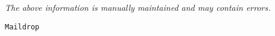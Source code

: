 \label{pkg:maildrop}

{\tiny \it The above information is manually maintained and may contain errors.}
\begin{verbatim}
Maildrop
\end{verbatim}
